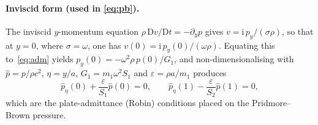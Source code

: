 \documentclass[11pt]{article}
\begin{document}
\paragraph{Inviscid form (used in \eqref{eq:pb}).} The inviscid $y$-momentum equation
$\rho\,\mathrm{D}v/\mathrm{D}t=-\partial_yp$ gives $v=\mathrm{i}\,p_y/(\sigma\rho)$, so that at $y=0$,
where $\sigma=\omega$, one has $v(0)=\mathrm{i}\,p_y(0)/(\omega\rho)$. Equating this to~\eqref{eq:adm}
yields $p_y(0)=-\omega^2\rho\,p(0)/G_1$, and non-dimensionalising with $\hat p=p/\rho c^2$, $\eta=y/a$,
$G_1=m_1\omega^2S_1$ and $\varepsilon=\rho a/m_1$ produces
\begin{equation}
\hat p_\eta(0)+\frac{\varepsilon}{S_1}\hat p(0)=0,\qquad
\hat p_\eta(1)-\frac{\varepsilon}{S_2}\hat p(1)=0,
\label{eq:robinp}
\end{equation}
which are the plate-admittance (Robin) conditions placed on the Pridmore--Brown pressure.
\end{document}
